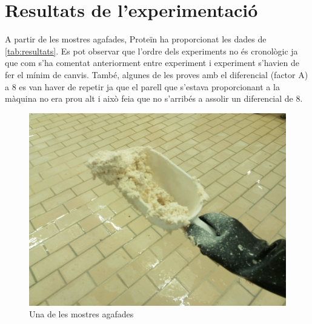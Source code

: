 \documentclass[a4paper]{article}
\begin{document}
\newpage

\section{Resultats de l'experimentació}
A partir de les mostres agafades, Proteïn ha proporcionat les dades de \autoref{tab:resultats}. Es pot observar que l'ordre dels experiments no és cronològic ja que com s'ha comentat anteriorment entre experiment i experiment s'havien de fer el mínim de canvis. També, algunes de les proves amb el diferencial (factor A) a 8 es van haver de repetir ja que el parell que s'estava proporcionant a la màquina no era prou alt i això feia que no s'arribés a assolir un diferencial de 8.

\begin{figure}[H]
	\centering
	\includegraphics[width=.5\textwidth]{images/protein/mostra-compressed}
	\caption{Una de les mostres agafades}
	\label{fig:Mostra}
\end{figure} 	
\end{document}
